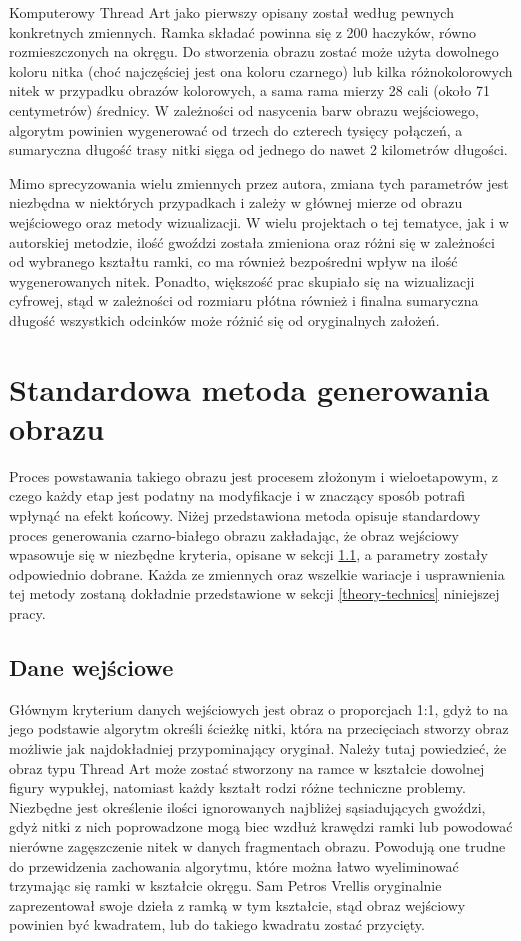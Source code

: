 \documentclass[a4paper, 12pt, polish, twoside]{extreport}
\begin{document}
    Komputerowy Thread Art jako pierwszy opisany został według pewnych konkretnych zmiennych. Ramka składać powinna się z 200 haczyków, równo rozmieszczonych na okręgu. Do stworzenia obrazu zostać może użyta dowolnego koloru nitka (choć najczęściej jest ona koloru czarnego) lub kilka różnokolorowych nitek w przypadku obrazów kolorowych, a sama rama mierzy 28 cali (około 71 centymetrów) średnicy. W zależności od nasycenia barw obrazu wejściowego, algorytm powinien wygenerować od trzech do czterech tysięcy połączeń, a sumaryczna długość trasy nitki sięga od jednego do nawet 2 kilometrów długości.
    
    Mimo sprecyzowania wielu zmiennych przez autora, zmiana tych parametrów jest niezbędna w niektórych przypadkach i zależy w głównej mierze od obrazu wejściowego oraz metody wizualizacji. W wielu projektach o tej tematyce, jak i w autorskiej metodzie, ilość gwoździ została zmieniona oraz różni się w zależności od wybranego kształtu ramki, co ma również bezpośredni wpływ na ilość wygenerowanych nitek. Ponadto, większość prac skupiało się na wizualizacji cyfrowej, stąd w zależności od rozmiaru płótna również i finalna sumaryczna długość wszystkich odcinków może różnić się od oryginalnych założeń.
    
    \section{Standardowa metoda generowania obrazu} \label{theory-std-method}
    Proces powstawania takiego obrazu jest procesem złożonym i wieloetapowym, z czego każdy etap jest podatny na modyfikacje i w znaczący sposób potrafi wpłynąć na efekt końcowy. Niżej przedstawiona metoda opisuje standardowy proces generowania czarno-białego obrazu zakładając, że obraz wejściowy wpasowuje się w niezbędne kryteria, opisane w sekcji \ref{theory-std-method-input}, a parametry zostały odpowiednio dobrane. Każda ze zmiennych oraz wszelkie wariacje i usprawnienia tej metody zostaną dokładnie przedstawione w sekcji \ref{theory-technics} niniejszej pracy.
        \subsection{Dane wejściowe} \label{theory-std-method-input}
        Głównym kryterium danych wejściowych jest obraz o proporcjach 1:1, gdyż to na jego podstawie algorytm określi ścieżkę nitki, która na przecięciach stworzy obraz możliwie jak najdokładniej przypominający oryginał. Należy tutaj powiedzieć, że obraz typu Thread Art może zostać stworzony na ramce w kształcie dowolnej figury wypukłej, natomiast każdy kształt rodzi różne techniczne problemy. Niezbędne jest określenie ilości ignorowanych najbliżej sąsiadujących gwoździ, gdyż nitki z nich poprowadzone mogą biec wzdłuż krawędzi ramki lub powodować nierówne zagęszczenie nitek w danych fragmentach obrazu. Powodują one trudne do przewidzenia zachowania algorytmu, które można łatwo wyeliminować trzymając się ramki w kształcie okręgu. Sam Petros Vrellis oryginalnie zaprezentował swoje dzieła z ramką w tym kształcie, stąd obraz wejściowy powinien być kwadratem, lub do takiego kwadratu zostać przycięty. 
        
\end{document}
